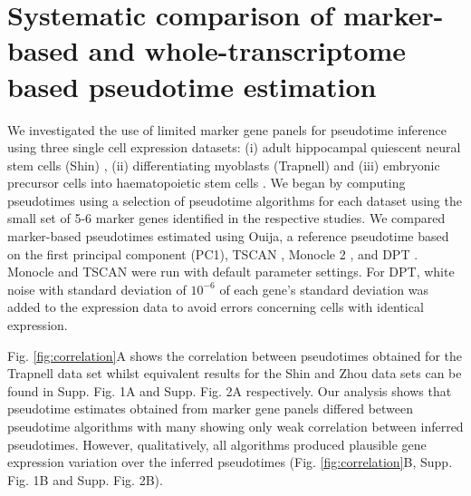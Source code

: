 \section{Systematic comparison of marker-based and whole-transcriptome based pseudotime estimation}

We investigated the use of limited marker gene panels for pseudotime inference using three single cell expression datasets: (i) adult hippocampal quiescent neural stem cells (Shin) \cite{Shin2015}, (ii) differentiating myoblasts (Trapnell) \cite{Trapnell2014} and (iii) embryonic precursor cells into haematopoietic stem cells \cite{zhou2016tracing}. We began by computing pseudotimes using a selection of pseudotime algorithms for each dataset using the small set of 5-6 marker genes identified in the respective studies. We compared marker-based pseudotimes estimated using Ouija, a reference pseudotime based on the first principal component (PC1), TSCAN  \cite{ji2016tscan}, Monocle 2 \cite{qiu2017reversed}, and DPT \cite{haghverdi2016diffusion}. Monocle and TSCAN were run with default parameter settings. For DPT, white noise with standard deviation of $10^{-6}$ of each gene’s standard deviation was added to the expression data to avoid errors concerning cells with identical expression.


%
%

Fig. \ref{fig:correlation}A shows the correlation between pseudotimes obtained for the Trapnell data set whilst equivalent results for the Shin and Zhou data sets can be found in Supp. Fig. 1A and Supp. Fig. 2A respectively. Our analysis shows that pseudotime estimates obtained from marker gene panels differed between pseudotime algorithms with many showing only weak correlation between inferred pseudotimes. However, qualitatively, all algorithms produced plausible gene expression variation over the inferred pseudotimes (Fig. \ref{fig:correlation}B, Supp. Fig. 1B and Supp. Fig. 2B).


